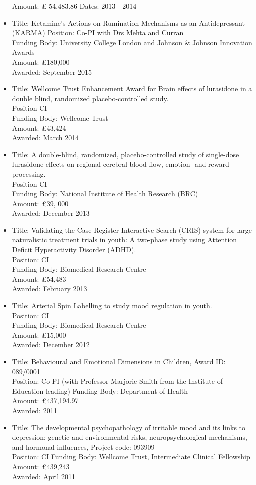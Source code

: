 \documentclass[
]{article}
\begin{document}
\begin{itemize}
  Amount: £ 54,483.86 Dates: 2013 - 2014
\item
  Title: Ketamine's Actions on Rumination Mechanisms as an
  Antidepressant (KARMA) Position: Co-PI with Drs Mehta and Curran\\
  Funding Body: University College London and Johnson \& Johnson
  Innovation Awards\\
  Amount: £180,000\\
  Awarded: September 2015
\item
  Title: Wellcome Trust Enhancement Award for Brain effects of
  lurasidone in a double blind, randomized placebo-controlled study.\\
  Position CI\\
  Funding Body: Wellcome Trust\\
  Amount: £43,424\\
  Awarded: March 2014
\item
  Title: A double-blind, randomized, placebo-controlled study of
  single-dose lurasidone effects on regional cerebral blood flow,
  emotion- and reward-processing.\\
  Position CI\\
  Funding Body: National Institute of Health Research (BRC)\\
  Amount: £39, 000\\
  Awarded: December 2013
\item
  Title: Validating the Case Register Interactive Search (CRIS) system
  for large naturalistic treatment trials in youth: A two-phase study
  using Attention Deficit Hyperactivity Disorder (ADHD).\\
  Position: CI\\
  Funding Body: Biomedical Research Centre\\
  Amount: £54,483\\
  Awarded: February 2013
\item
  Title: Arterial Spin Labelling to study mood regulation in youth.\\
  Position: CI\\
  Funding Body: Biomedical Research Centre\\
  Amount: £15,000\\
  Awarded: December 2012
\item
  Title: Behavioural and Emotional Dimensions in Children, Award ID:
  089/0001\\
  Position: Co-PI (with Professor Marjorie Smith from the Institute of
  Education leading) Funding Body: Department of Health\\
  Amount: £437,194.97\\
  Awarded: 2011
\item
  Title: The developmental psychopathology of irritable mood and its
  links to depression: genetic and environmental risks,
  neuropsychological mechanisms, and hormonal influences, Project code:
  093909\\
  Position: CI Funding Body: Wellcome Trust, Intermediate Clinical
  Fellowship\\
  Amount: £439,243\\
  Awarded: April 2011
\end{itemize}
\end{document}
